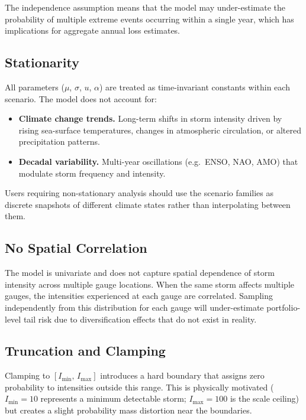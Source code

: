 \documentclass[11pt,a4paper]{article}
\begin{document}
\noindent The independence assumption means that the model may under-estimate
the probability of multiple extreme events occurring within a single year,
which has implications for aggregate annual loss estimates.

\subsection{Stationarity}

All parameters ($\mu$, $\sigma$, $u$, $\alpha$) are treated as time-invariant
constants within each scenario. The model does not account for:
\begin{itemize}[nosep]
    \item \textbf{Climate change trends.} Long-term shifts in storm intensity driven
          by rising sea-surface temperatures, changes in atmospheric circulation, or
          altered precipitation patterns.
    \item \textbf{Decadal variability.} Multi-year oscillations (e.g.\ ENSO, NAO,
          AMO) that modulate storm frequency and intensity.
\end{itemize}

\noindent Users requiring non-stationary analysis should use the scenario families
as discrete snapshots of different climate states rather than interpolating between
them.

\subsection{No Spatial Correlation}

The model is univariate and does not capture spatial dependence of storm intensity
across multiple gauge locations. When the same storm affects multiple gauges, the
intensities experienced at each gauge are correlated. Sampling independently from
this distribution for each gauge will under-estimate portfolio-level tail risk
due to diversification effects that do not exist in reality.

\subsection{Truncation and Clamping}

Clamping to $[I_{\min},\, I_{\max}]$ introduces a hard boundary that assigns
zero probability to intensities outside this range. This is physically motivated
($I_{\min} = 10$ represents a minimum detectable storm; $I_{\max} = 100$ is the
scale ceiling) but creates a slight probability mass distortion near the boundaries.
\end{document}
